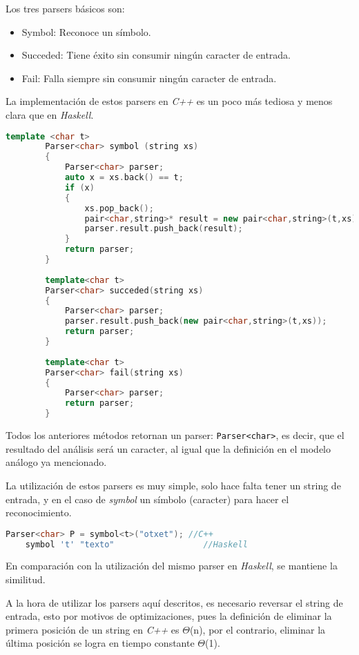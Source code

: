 	Los tres parsers básicos son:
	\begin{itemize}
		\item Symbol: Reconoce un símbolo.
		\item Succeded: Tiene éxito sin consumir ningún caracter de entrada.
		\item Fail: Falla siempre sin consumir ningún caracter de entrada.
	\end{itemize}
	
	La implementación de estos parsers en \emph{C++} es un poco más tediosa y menos clara que en \emph{Haskell}.
	
	\begin{lstlisting}[language=C++, caption="Parsers básicos"]
		template <char t>
		Parser<char> symbol (string xs)
		{
			Parser<char> parser;
			auto x = xs.back() == t;
			if (x)
			{
				xs.pop_back();
				pair<char,string>* result = new pair<char,string>(t,xs);
				parser.result.push_back(result);
			}			
			return parser;
		}
		
		template<char t>
		Parser<char> succeded(string xs)
		{
			Parser<char> parser;
			parser.result.push_back(new pair<char,string>(t,xs));
			return parser;
		}
		
		template<char t>
		Parser<char> fail(string xs)
		{
			Parser<char> parser;
			return parser;
		}		
	\end{lstlisting}
	
	Todos los anteriores métodos retornan un parser: \texttt{Parser<char>}, es decir, que el resultado del análisis será un caracter, al igual que la definición en el modelo análogo ya mencionado.
	
	La utilización de estos parsers es muy simple, solo hace falta tener un string de entrada, y en el caso de \emph{symbol} un símbolo (caracter) para hacer el reconocimiento.
	
	\begin{lstlisting}[language=C++]
	Parser<char> P = symbol<t>("otxet"); //C++
	symbol 't' "texto"					//Haskell
	\end{lstlisting}
	En comparación con la utilización del mismo parser en \emph{Haskell}, se mantiene la similitud.
	
	A la hora de utilizar los parsers aquí descritos, es necesario reversar el string de entrada, esto por motivos de optimizaciones, pues la definición de eliminar la primera posición de un string en \emph{C++} es $\Theta$(n), por el contrario, eliminar la última posición se logra en tiempo constante $\Theta$(1).
	
